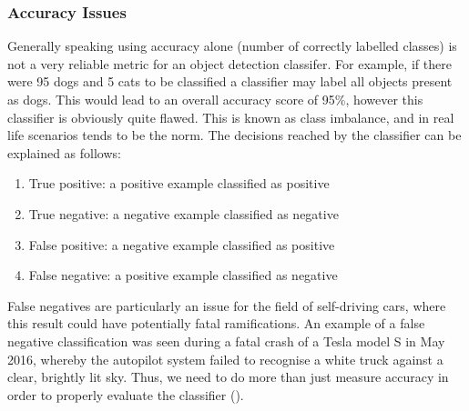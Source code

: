 \documentclass[12pt]{report}
\begin{document}
\subsubsection{Accuracy Issues}

\begin{flushleft}
Generally speaking using accuracy alone (number of correctly labelled classes) is not a very reliable metric for an object detection classifer. For example, if there were 95 dogs and 5 cats to be classified a classifier may label all objects present as dogs. This would lead to an overall accuracy score of 95\%, however this classifier is obviously quite flawed. This is known as class imbalance, and in real life scenarios tends to be the norm. The decisions reached by the classifier can be explained as follows:

\begin{enumerate}
  \item True positive: a positive example classified as positive
  \item True negative: a negative example classified as negative
  \item False positive: a negative example classified as positive
  \item False negative: a positive example classified as negative
\end{enumerate}

False negatives are particularly an issue for the field of self-driving cars, where this result could have potentially fatal ramifications. An example of a false negative classification was seen during a fatal crash of a Tesla model S in May 2016, whereby the autopilot system failed to recognise a white truck against a clear, brightly lit sky. Thus, we need to do more than just measure accuracy in order to properly evaluate the classifier (\cite{rogers2016first}).
\end{flushleft}
\end{document}
